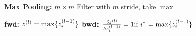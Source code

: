 \textbf{Max Pooling:} $m \times m$ Filter with $m$ stride, take $\max$\\

\textbf{fwd:} $z^{(l)} = \max \{ z_i^{(l-1)} \}$ \textbf{bwd:} $\frac{\delta z^{(l)}}{\delta z_i^{(l-1)}} = 1 \text{if } i^{*} = \max \{ z_i^{(l-1)} \}$\\


